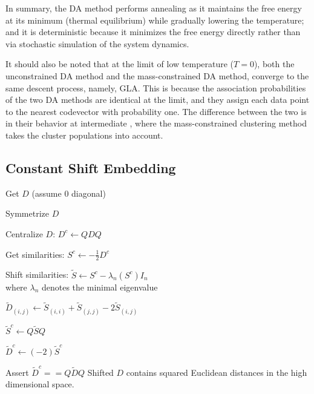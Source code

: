 \documentclass[12pt]{article}
\begin{document}
\par In summary, the DA method performs annealing as it maintains the free energy at its minimum (thermal equilibrium) while gradually lowering the temperature; and it is deterministic because it minimizes the free energy directly rather than via stochastic simulation of the system dynamics.
\par It should also be noted that at the limit of low temperature ($T = 0$), both the unconstrained DA method and the mass-constrained DA method, converge to the same descent process, namely, GLA. This is because the association probabilities of the two DA methods are identical at the limit, and they assign each data point to the nearest codevector with probability one. The difference between the two is in their behavior at intermediate , where the mass-constrained clustering method takes the cluster populations into account.

\subsection{Constant Shift Embedding}
\olb
\item Get $D$ (assume $0$ diagonal)
\item Symmetrize $D$
\item Centralize $D$: $D^c \leftarrow QDQ$
\item Get similarities: $S^c \leftarrow -\frac{1}{2} D^c$
\item Shift similarities: $\tilde{S} \leftarrow S^c - \lambda_n (S^c)I_n$ \\
where $\lambda_n$ denotes the minimal eigenvalue
\item $\tilde{D}_{(i,j)} \leftarrow \tilde{S}_{(i,i)} + \tilde{S}_{(j,j)} - 2\tilde{S}_{(i,j)}$
\item $\tilde{S}^c \leftarrow Q\tilde{S} Q$
\item $\tilde{D}^c \leftarrow (-2)\tilde{S}^c$
\item Assert $\tilde{D}^c == Q \tilde{D} Q$
\ole
Shifted $D$ contains squared Euclidean distances in the high dimensional space.
\end{document}
